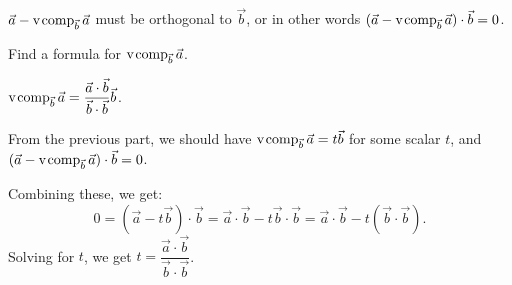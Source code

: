 \documentclass{workbook}
\begin{document}
\begin{slide}
\begin{parts}
\begin{solution}
				$\vec a - \operatorname{\operatorname{v\hspace{1pt}comp}}_{\vec b} \vec a$ must be orthogonal to $\vec b$,
				or in other words $(\vec a-\operatorname{\operatorname{v\hspace{1pt}comp}}_{\vec b}\vec a)\cdot \vec b=0$.
			\end{solution}
		\item Find a formula for $\operatorname{\operatorname{v\hspace{1pt}comp}}_{\vec b}\vec a$.
			\begin{solution}
				$\operatorname{\operatorname{v\hspace{1pt}comp}}_{\vec b}\vec a = \dfrac{\vec a\cdot\vec b}{\vec b\cdot\vec b} \vec b$.

				From the previous part, we should have $\operatorname{\operatorname{v\hspace{1pt}comp}}_{\vec b}\vec a=t\vec b$
				for some scalar $t$, and $(\vec a-\operatorname{\operatorname{v\hspace{1pt}comp}}_{\vec b}\vec a)\cdot \vec b=0$.

				Combining these, we get:
				\[
					0=(\vec a-t \vec b)\cdot \vec b
					=\vec a\cdot\vec b - t\vec b\cdot\vec b
					=\vec a\cdot\vec b - t(\vec b\cdot\vec b).
				\]
				Solving for $t$, we get $t = \dfrac{\vec a\cdot\vec b}{\vec b\cdot\vec b}$.
			\end{solution}
	\end{parts}

\end{slide}
\end{document}
